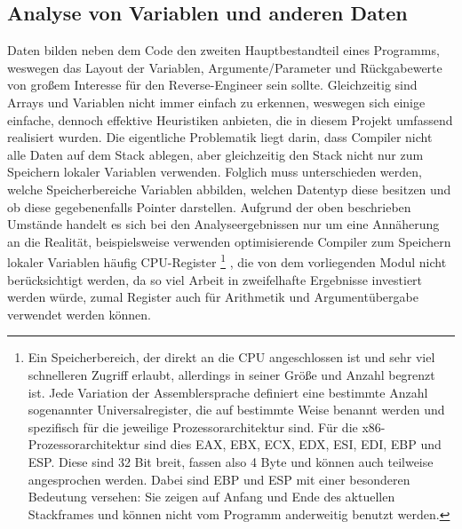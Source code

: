 \documentclass[11pt]{article}
\begin{document}
\subsection{Analyse von Variablen und anderen Daten} Daten bilden neben dem Code den zweiten
Hauptbestandteil eines Programms, weswegen das Layout der Variablen, Argumente/Parameter und
Rückgabewerte von großem Interesse für den Reverse-Engineer sein sollte. Gleichzeitig sind Arrays
und Variablen nicht immer einfach zu erkennen, weswegen sich einige einfache, dennoch effektive
Heuristiken anbieten, die in diesem Projekt umfassend realisiert wurden. Die eigentliche Problematik
liegt darin, dass Compiler nicht alle Daten auf dem Stack ablegen, aber gleichzeitig den Stack nicht
nur zum Speichern lokaler Variablen verwenden. Folglich muss unterschieden werden, welche
Speicherbereiche Variablen abbilden, welchen Datentyp diese besitzen und ob diese gegebenenfalls
Pointer darstellen. Aufgrund der oben beschrieben Umstände handelt es sich bei den
Analyseergebnissen nur um eine Annäherung an die Realität, beispielsweise verwenden optimisierende
Compiler zum Speichern lokaler Variablen häufig CPU-Register
\footnote{Ein Speicherbereich, der direkt an die CPU angeschlossen ist und sehr viel schnelleren
Zugriff erlaubt, allerdings in seiner Größe und Anzahl begrenzt ist. Jede Variation der
Assemblersprache definiert eine bestimmte Anzahl sogenannter Universalregister, die auf bestimmte
Weise benannt werden und spezifisch für die jeweilige Prozessorarchitektur sind. Für die
x86-Prozessorarchitektur sind dies EAX, EBX, ECX, EDX, ESI, EDI, EBP und ESP. Diese sind 32 Bit
breit, fassen also 4 Byte und können auch teilweise angesprochen werden. Dabei sind EBP und ESP mit
einer besonderen Bedeutung versehen: Sie zeigen auf Anfang und Ende des aktuellen Stackframes und
können nicht vom Programm anderweitig benutzt werden.}
, die von dem vorliegenden
Modul nicht berücksichtigt werden, da so viel Arbeit in zweifelhafte Ergebnisse investiert
werden würde, zumal Register auch für Arithmetik und Argumentübergabe verwendet werden können.
\end{document}
